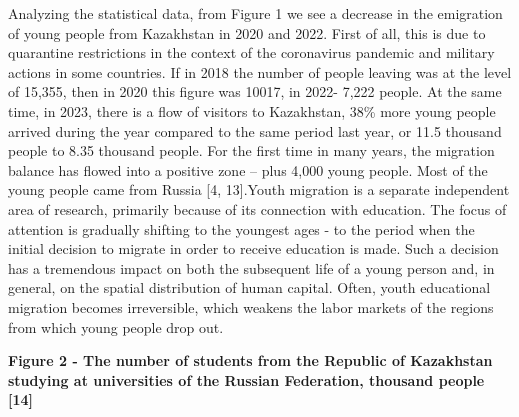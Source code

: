 \begin{multicols}{2}
Analyzing the statistical data, from Figure 1 we see a decrease in the
emigration of young people from Kazakhstan in 2020 and 2022. First of
all, this is due to quarantine restrictions in the context of the
coronavirus pandemic and military actions in some countries. If in 2018
the number of people leaving was at the level of 15,355, then in 2020
this figure was 10017, in 2022- 7,222 people. At the same time, in 2023,
there is a flow of visitors to Kazakhstan, 38\% more young people
arrived during the year compared to the same period last year, or 11.5
thousand people to 8.35 thousand people. For the first time in many
years, the migration balance has flowed into a positive zone -- plus
4,000 young people. Most of the young people came from Russia {[}4,
13{]}.Youth migration is a separate independent area of research,
primarily because of its connection with education. The focus of
attention is gradually shifting to the youngest ages - to the period
when the initial decision to migrate in order to receive education is
made. Such a decision has a tremendous impact on both the subsequent
life of a young person and, in general, on the spatial distribution of
human capital. Often, youth educational migration becomes irreversible,
which weakens the labor markets of the regions from which young people
drop out.
\end{multicols}

{\bfseries Figure 2 - The number of students from the Republic of
Kazakhstan studying at universities of the Russian Federation, thousand
people {[}14{]}}

